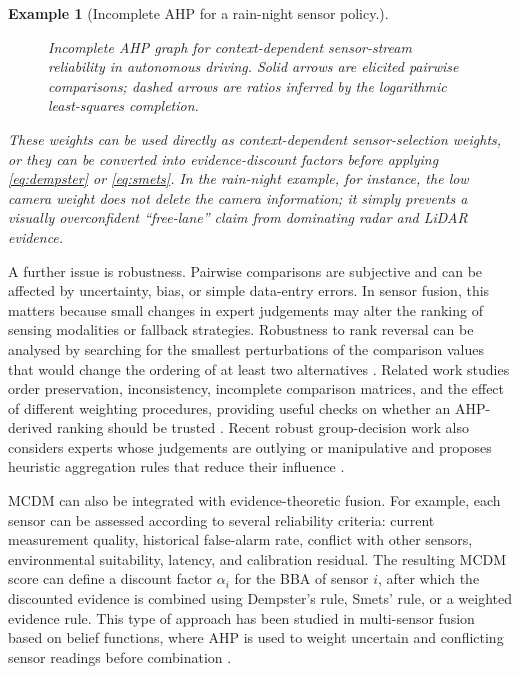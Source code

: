 \documentclass{ieeeaccess}
\newtheorem{example}{Example}
\begin{document}
\begin{example}[Incomplete AHP for a rain-night sensor policy.]
\begin{figure}[t]
    \caption{Incomplete AHP graph for context-dependent sensor-stream reliability in autonomous driving. Solid arrows are elicited pairwise comparisons; dashed arrows are ratios inferred by the logarithmic least-squares completion.}
    \label{fig:incomplete-ahp-autonomous-driving-example}
\end{figure}

These weights can be used directly as context-dependent sensor-selection weights, or they can be converted into evidence-discount factors before applying \eqref{eq:dempster} or \eqref{eq:smets}. In the rain-night example, for instance, the low camera weight does not delete the camera information; it simply prevents a visually overconfident ``free-lane'' claim from dominating radar and LiDAR evidence. 
\end{example}
\smallskip

A further issue is robustness. Pairwise comparisons are subjective and can be affected by uncertainty, bias, or simple data-entry errors. In sensor fusion, this matters because small changes in expert judgements may alter the ranking of sensing modalities or fallback strategies. Robustness to rank reversal can be analysed by searching for the smallest perturbations of the comparison values that would change the ordering of at least two alternatives \cite{faramondi_robustness_2023}. Related work studies order preservation, inconsistency, incomplete comparison matrices, and the effect of different weighting procedures, providing useful checks on whether an AHP-derived ranking should be trusted \cite{kulakowski_orderpreservation_2015,agoston_csato_inconsistency_2022,csato_agoston_bozoki_2024}. Recent robust group-decision work also considers experts whose judgements are outlying or manipulative and proposes heuristic aggregation rules that reduce their influence \cite{kulakowski_resilient_2024}.

MCDM can also be integrated with evidence-theoretic fusion. For example, each sensor can be assessed according to several reliability criteria: current measurement quality, historical false-alarm rate, conflict with other sensors, environmental suitability, latency, and calibration residual. The resulting MCDM score can define a discount factor \(\alpha_i\) for the BBA of sensor \(i\), after which the discounted evidence is combined using Dempster's rule, Smets' rule, or a weighted evidence rule. This type of approach has been studied in multi-sensor fusion based on belief functions, where AHP is used to weight uncertain and conflicting sensor readings before combination \cite{frikha_ahp_2015}.
\end{document}
